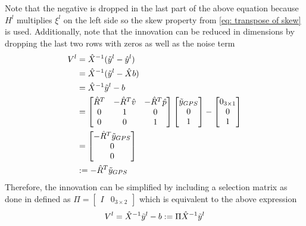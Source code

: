Note that the negative is dropped in the last part of the above equation because $H^l$ multiplies $\xi^l$ on the left side so the skew property from \eqref{eq: transpose of skew} is used. Additionally, note that the innovation can be reduced in dimensions by dropping the last two rows with zeros as well as the noise term
\begin{equation}
    \begin{split}
        V^l &= \hat{X}^{-1} (\Tilde{y}^l  - \hat{y}^l ) \\
        &= \hat{X}^{-1} (\Tilde{y}^l - \hat{X} b) \\
        &= \hat{X}^{-1} \Tilde{y}^l  - b\\
        &= \begin{bmatrix}
            \hat{R}^T & -\hat{R}^T \hat{v} & -\hat{R}^T \hat{p} \\
            0 & 1 & 0\\
            0 & 0 & 1
        \end{bmatrix}
        \begin{bmatrix}
            \Tilde{y}_{GPS} \\
            0 \\
            1
        \end{bmatrix}
        - 
        \begin{bmatrix}
            0_{3 \times 1} \\
            0 \\
            1
        \end{bmatrix} \\
        &= 
        \begin{bmatrix}
            -\hat{R}^T \Tilde{y}_{GPS} \\
            0 \\
            0
        \end{bmatrix} \\
        &:= -\hat{R}^T \Tilde{y}_{GPS}
    \end{split}
    \label{eq: innovation meas LInEKF}
\end{equation}
Therefore, the innovation can be simplified by including a selection matrix as done in \cite{DBLP:journals/corr/BarrauB14} defined as $\Pi = \begin{bmatrix}
    I & 0_{3 \times 2} \end{bmatrix}$ which is equivalent to the above expression 
\begin{equation}
    V^l = \hat{X}^{-1} \Tilde{y}^l - b := \Pi \hat{X}^{-1} \Tilde{y}^l
    \label{eq: reduced measurement residual}
\end{equation} 
